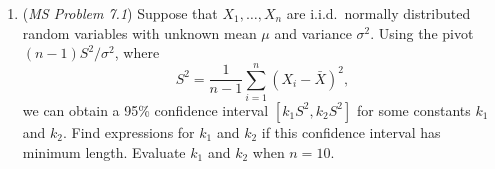 \documentclass[12pt]{article}
\newcommand{\Var}{\text{Var}}
\begin{document}
\begin{enumerate}
\textcolor{red}{Differentiate 
\begin{align*}
    &\frac{\partial }{\partial \theta}\int g(x; \theta) f(x ; \theta) dx = 0\\
    &\int \frac{\partial}{\partial \theta}g(x ; \theta) f(x ; \theta) dx = 0\\
    &\int \frac{\partial g(x ; \theta)}{\partial \theta}f(x ; \theta) + g(x ; \theta) \frac{\partial f(x ; \theta)}{\partial \theta} dx = 0
\end{align*}
Now, 
\begin{equation*}
    E\left[\frac{\partial g(X ; \theta)}{\partial \theta}\right] = \int \frac{\partial g(x ; \theta)}{\partial \theta}f(x ; \theta) dx 
\end{equation*}
Also, notice that 
\begin{equation*}
    \frac{\partial f(x ; \theta)}{\partial \theta} = f(x;\theta)\frac{\partial \ell(\theta ; x)}{\partial x}
\end{equation*}
where $\ell(\theta ; x) = \log f(x; \theta)$ is the log-likelihood. Thus,
\begin{equation*}
    \int g(x;\theta)\frac{\partial f(x;\theta)}{\partial \theta}dx = \int g(x;\theta)\frac{\partial \ell(\theta;x)}{\partial \theta} f(x;\theta) dx = E\left[g(X;\theta) \frac{\partial \ell(\theta;X)}{\partial \theta}\right]
\end{equation*}
hence
\begin{equation*}
    E\left[g(X;\theta) \frac{\partial \ell(\theta;X)}{\partial \theta}\right] = -E\left[\frac{\partial g(X ; \theta)}{\partial \theta}\right]
\end{equation*}
By the Cauchy-Schwarz inequality, 
\begin{equation*}
    \left(E\left[g(X;\theta) \frac{\partial \ell(\theta;X)}{\partial \theta}\right]\right)^2 \leq E(g(X;\theta)^2)I_1(\theta) 
\end{equation*}
thus 
\begin{equation*}
    E(g(X;\theta^2))I_1(\theta) \geq E\left[-\frac{\partial g(X;\theta)}{\partial \theta}\right]^2
\end{equation*}
Since $g(X;\theta)$ is unbiased, then $E(g(X;\theta)^2) = \Var(g(X;\theta))$, thus 
\begin{equation*}
    \frac{\Var(g(X;\theta))}{E\left[-\frac{\partial g(X;\theta)}{\partial \theta}\right]^2} \leq I_1^{-1}(\theta)
\end{equation*}
follows immediately. 
}
\item ({\it MS Problem 7.1}) Suppose that $X_1, \dots, X_n$ are i.i.d.~normally distributed random variables with unknown mean $\mu$ and variance $\sigma^2$. 
Using the pivot $(n-1)S^2/\sigma^2$, where $$S^2 = \frac{1}{n-1}\sum_{i=1}^n(X_i-\bar X)^2,$$ we can obtain a 95\% confidence interval $[k_1S^2,k_2S^2]$ for some constants $k_1$ and $k_2$. Find expressions for $k_1$ and $k_2$ if this confidence interval has minimum length. Evaluate $k_1$ and $k_2$ when $n=10$.


\end{enumerate}
\end{document}
